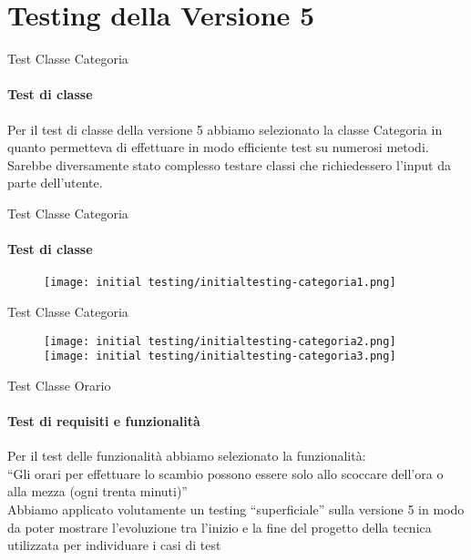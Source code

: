 \section{Testing della Versione 5}


\begin{frame}{Test Classe Categoria}
    \framesubtitle{Test di classe}
    Per il test di classe della versione 5 abbiamo selezionato la classe Categoria in quanto permetteva di effettuare in modo efficiente test su numerosi metodi.\\\bigskip
    Sarebbe diversamente stato complesso testare classi che richiedessero l'input da parte dell'utente.
\end{frame}

\begin{frame}{Test Classe Categoria}
    \framesubtitle{Test di classe}
    
    \begin{figure}
        \centering
        \texttt{[image: initial testing/initialtesting-categoria1.png]}
    \end{figure}    

\end{frame}
        
\begin{frame}{Test Classe Categoria}
    \begin{figure}
        \centering
        \texttt{[image: initial testing/initialtesting-categoria2.png]}
        \texttt{[image: initial testing/initialtesting-categoria3.png]}
    \end{figure}    
\end{frame}


\begin{frame}{Test Classe Orario}
    \framesubtitle{Test di requisiti e funzionalità}
    Per il test delle funzionalità abbiamo selezionato la funzionalità:\\
    ``Gli orari per effettuare lo scambio possono essere solo allo scoccare dell'ora o alla mezza (ogni trenta minuti)''\\\bigskip
    Abbiamo applicato volutamente un testing ``superficiale'' sulla versione 5 in modo da poter mostrare l'evoluzione tra l'inizio e la fine del progetto della tecnica utilizzata per individuare i casi di test
    
\end{frame} 

